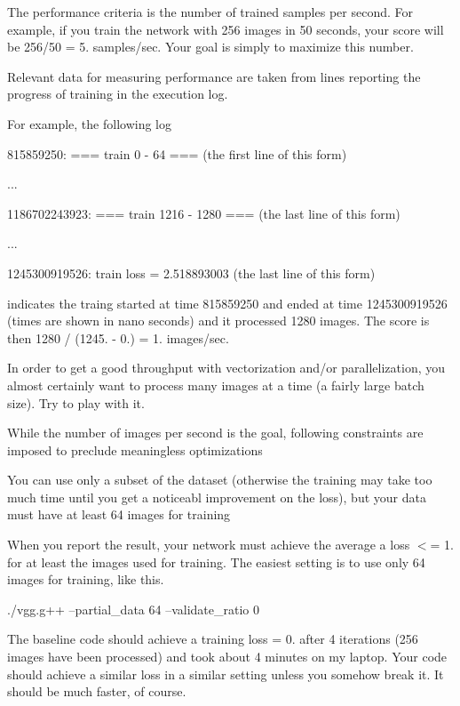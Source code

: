 \begin{DoxyItemize}
\item The performance criteria is the number of trained samples per second. For example, if you train the network with 256 images in 50 seconds, your score will be 256/50 = 5. samples/sec. Your goal is simply to maximize this number.
\item Relevant data for measuring performance are taken from lines reporting the progress of training in the execution log.
\item For example, the following log 
\begin{DoxyCode}
815859250: === train 0 - 64 ===    (the first line of this form)

  ...

1186702243923: === train 1216 - 1280 ===  (the last line of this form)

  ...

1245300919526: train loss = 2.518893003   (the last line of this form)
\end{DoxyCode}
 indicates the traing started at time 815859250 and ended at time 1245300919526 (times are shown in nano seconds) and it processed 1280 images. The score is then 1280 / (1245. -\/ 0.) = 1. images/sec.
\item In order to get a good throughput with vectorization and/or parallelization, you almost certainly want to process many images at a time (a fairly large batch size). Try to play with it.
\item While the number of images per second is the goal, following constraints are imposed to preclude meaningless optimizations
\begin{DoxyItemize}
\item You can use only a subset of the dataset (otherwise the training may take too much time until you get a noticeabl improvement on the loss), but your data must have at least 64 images for training
\item When you report the result, your network must achieve the average a loss $<$= 1. for at least the images used for training. The easiest setting is to use only 64 images for training, like this. 
\begin{DoxyCode}
./vgg.g++ --partial\_data 64 --validate\_ratio 0
\end{DoxyCode}

\item The baseline code should achieve a training loss = 0. after 4 iterations (256 images have been processed) and took about 4 minutes on my laptop. Your code should achieve a similar loss in a similar setting unless you somehow break it. It should be much faster, of course.
\end{DoxyItemize}
\end{DoxyItemize}

